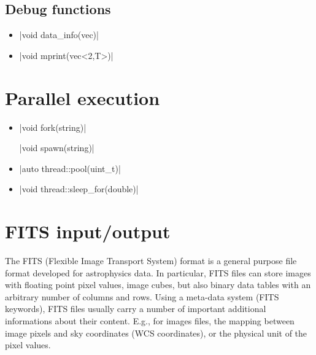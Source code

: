 \documentclass[12pt]{report}
\begin{document}
\subsection{Debug functions}

\begin{itemize}
\item \cppinline|void data_info(vec)| 
\item \cppinline|void mprint(vec<2,T>)| 
\end{itemize}

\section{Parallel execution \label{SEC:support:thread}}

\begin{itemize}
\item \cppinline|void fork(string)| 

\cppinline|void spawn(string)| 

\item \cppinline|auto thread::pool(uint_t)| 

\item \cppinline|void thread::sleep_for(double)| 
\end{itemize}

\section{FITS input/output \label{SEC:support:fits}}

The FITS (Flexible Image Transport System) format is a general purpose file format developed for astrophysics data. In particular, FITS files can store images with floating point pixel values, image cubes, but also binary data tables with an arbitrary number of columns and rows. Using a meta-data system (FITS keywords), FITS files usually carry a number of important additional informations about their content. E.g., for images files, the mapping between image pixels and sky coordinates (WCS coordinates), or the physical unit of the pixel values.
\end{document}
